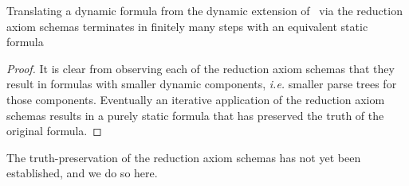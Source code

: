 \begin{theorem}
	Translating a dynamic formula from the dynamic extension of \DASL\ via the reduction axiom schemas terminates in finitely many steps with an equivalent static formula
\end{theorem}
\begin{proof}
	It is clear from observing each of the reduction axiom schemas that they result in formulas with smaller dynamic components, \emph{i.e.} smaller parse trees for those components. Eventually an iterative application of the reduction axiom schemas results in a purely static formula that has preserved the truth of the original formula.
\end{proof}

The truth-preservation of the reduction axiom schemas has not yet been established, and we do so here.

